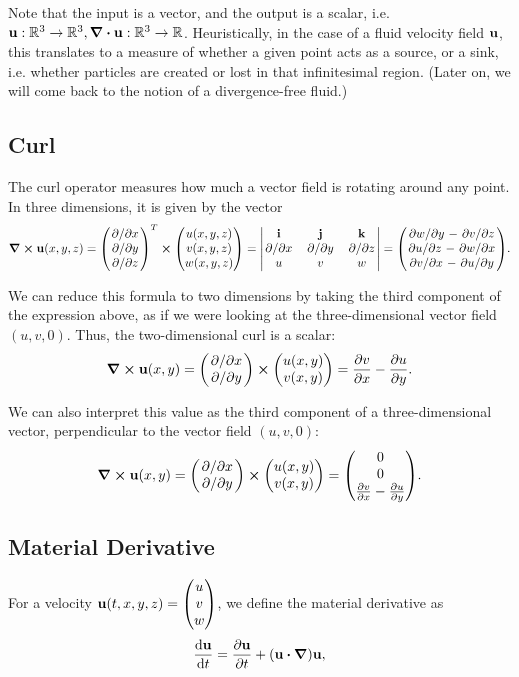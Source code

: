 Note that the input is a vector, and the output is a scalar, i.e. $\vb{u}:
\mathbb{R}^3 \to \mathbb{R}^3, \div{\vb{u}}: \mathbb{R}^3\to\mathbb{R}$.
Heuristically, in the case of a fluid velocity field $\vb{u}$, this translates
to a measure of whether a given point acts as a source, or a sink, i.e. whether
particles are created or lost in that infinitesimal region. (Later on, we will
come back to the notion of a divergence-free fluid.)

\subsection*{Curl}\label{section:curl}
The curl operator measures how much a vector field is rotating around any point. 
In three dimensions, it is given by the vector
$$\curl{\vb{u}(x,y,z) = 
    \mqty(\pdv*{x} \\ \pdv*{y} \\  \pdv*{z})^T \cross 
    \mqty(u(x,y,z) \\ v(x,y,z) \\ w(x,y,z))
= \mqty|
    \vb{i}   & \vb{j}   & \vb{k}   \\
    \pdv*{x} & \pdv*{y} & \pdv*{z} \\
    u        & v        & w
|} = \mqty(
\pdv*{w}{y} - \pdv*{v}{z} \\
\pdv*{u}{z} - \pdv*{w}{x} \\
\pdv*{v}{x} - \pdv*{u}{y}
).$$

We can reduce this formula to two dimensions by taking the third component of
the expression above, as if we were looking at the three-dimensional vector
field $(u,v,0)$. Thus, the two-dimensional curl is a scalar:
$$\curl{\vb{u}(x,y)} = 
    \mqty(\pdv*{x} \\ \pdv*{y}) \cross 
    \mqty(u(x,y) \\ v(x,y))
    = \pdv{v}{x} - \pdv{u}{y}.$$

We can also interpret this value as the third component of a three-dimensional
vector, perpendicular to the vector field $(u,v,0)$:
$$\curl{\vb{u}(x,y)} = 
    \mqty(\pdv*{x} \\ \pdv*{y}) \cross 
    \mqty(u(x,y) \\ v(x,y))
    = 
    \mqty(0\\0\\\pdv{v}{x} - \pdv{u}{y}).$$


\subsection*{Material Derivative}
For a velocity $\vb{u}(t,x,y,z) = \mqty(u \\ v \\ w)$, 
we define the material derivative as 
$$\dv{\vb{u}}{t} = \pdv{\vb{u}}{t} + \qty(\vb{u}\vdot\grad)\vb{u} ,$$


